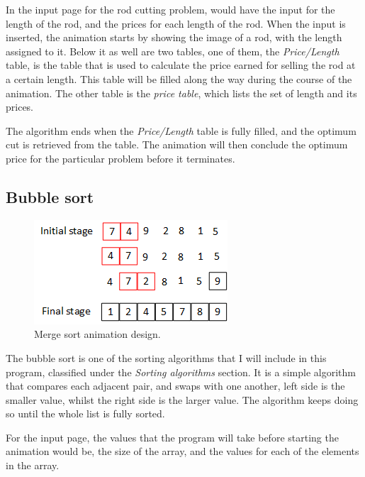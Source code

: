 In the input page for the rod cutting problem, would have the input for the length of the rod, and the prices for each length of the rod. When the input is inserted, the animation starts by showing the image of a rod, with the length assigned to it. Below it as well are two tables, one of them, the \textit{Price/Length} table, is the table that is used to calculate the price earned for selling the rod at a certain length. This table will be filled along the way during the course of the animation. The other table is the \textit{price table}, which lists the set of length and its prices. 

The algorithm ends when the \textit{Price/Length} table is fully filled, and the optimum cut is retrieved from the table. The animation will then conclude the optimum price for the particular problem before it terminates.



\newpage

\subsection{Bubble sort}

\begin{figure}[H]
\centering
\includegraphics[scale=1.5]{images/report_images/animationDesignBubbleSort.png}
\caption{Merge sort animation design.}
\label{animationDesignBubbleSort}
\end{figure}

The bubble sort is one of the sorting algorithms that I will include in this program, classified under the \textit{Sorting algorithms} section. It is a simple algorithm that compares each adjacent pair, and swaps with one another, left side is the smaller value, whilst the right side is the larger value. The algorithm keeps doing so until the whole list is fully sorted.

For the input page, the values that the program will take before starting the animation would be, the size of the array, and the values for each of the elements in the array.

